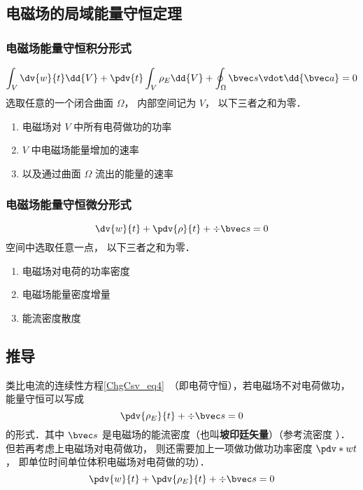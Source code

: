 \subsection{电磁场的局域能量守恒定理}

\subsubsection{电磁场能量守恒积分形式}
\begin{equation}
\int_V \dv{w}{t} \dd{V}  + \pdv{t} \int_V \rho_E \dd{V}  + \oint_\Omega  \bvec s \vdot \dd{\bvec a}  = 0
\end{equation} 
选取任意的一个闭合曲面 $\Omega $， 内部空间记为 $V$， 以下三者之和为零．
\begin{enumerate}
\item 电磁场对 $V$ 中所有电荷做功的功率
\item $V$ 中电磁场能量增加的速率
\item 以及通过曲面 $\Omega $ 流出的能量的速率
\end{enumerate}

\subsubsection{电磁场能量守恒微分形式}
\begin{equation}
\dv{w}{t} + \pdv{\rho}{t} + \div \bvec s = 0
\end{equation} 
空间中选取任意一点， 以下三者之和为零．
\begin{enumerate}
\item 电磁场对电荷的功率密度
\item 电磁场能量密度增量
\item 能流密度散度
\end{enumerate}

\subsection{推导}
类比电流的连续性方程\autoref{ChgCsv_eq4}~（即电荷守恒），若电磁场不对电荷做功，能量守恒可以写成
\begin{equation}
\pdv{\rho_E}{t} + \div \bvec s = 0
\end{equation} 
的形式．其中 $\bvec s$ 是电磁场的能流密度（也叫\textbf{坡印廷矢量}）（参考流密度%
）．但若再考虑上电磁场对电荷做功， 则还需要加上一项做功做功功率密度 $\pdv*{w}{t}$， 即单位时间单位体积电磁场对电荷做的功）．
\begin{equation}\label{EBS_eq1}
\pdv{w}{t} + \pdv{\rho_E}{t} + \div \bvec s = 0
\end{equation} 

